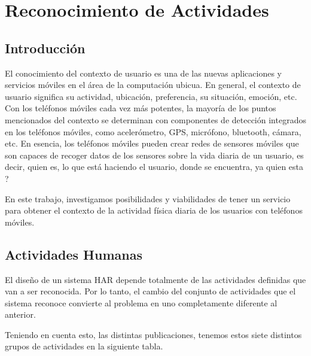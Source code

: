 
\chapter{Reconocimiento de Actividades}
\label{chap:Reconocimiento de Actividades}

%

\section{Introducción}
El conocimiento del contexto de usuario es una de las nuevas aplicaciones y servicios móviles en el área de la computación ubicua.
En general, el contexto de usuario significa su actividad, ubicación, preferencia, su situación, emoción, etc. Con los teléfonos móviles cada vez más potentes, la mayoría de los puntos mencionados del contexto se determinan con componentes de detección integrados en los teléfonos móviles, como acelerómetro, GPS, micrófono, bluetooth, cámara, etc. En esencia, los teléfonos móviles pueden crear redes de sensores móviles que son capaces de recoger datos de los sensores sobre la vida diaria de un usuario, es decir, quien es, lo que está haciendo el usuario, donde se encuentra, ya quien esta ? 

En este trabajo, investigamos posibilidades y viabilidades de tener un servicio para obtener el contexto de la actividad física diaria de los usuarios con teléfonos móviles.

\section{Actividades Humanas}
El diseño de un sistema HAR depende totalmente de las actividades definidas que van a ser reconocida. Por lo tanto, el cambio del conjunto de actividades que el sistema reconoce convierte al problema en uno completamente diferente al anterior.

Teniendo en cuenta esto, las distintas publicaciones, tenemos estos siete distintos grupos de actividades en la siguiente tabla.

\newcommand{\rr}{\raggedright}
\newcommand{\tn}{\tabularnewline}

